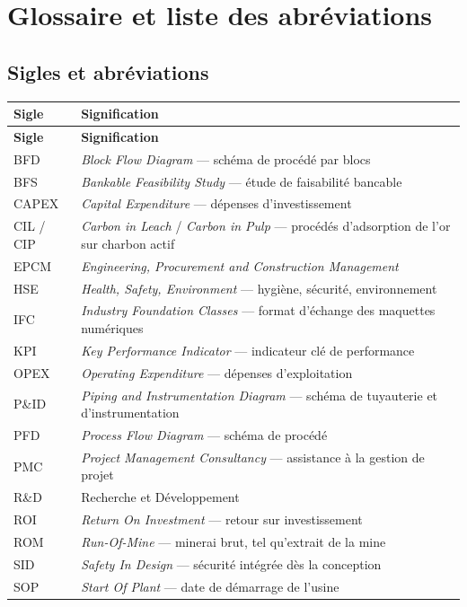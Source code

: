 \chapter*{Glossaire et liste des abréviations}

\section*{Sigles et abréviations}

\begin{longtable}{@{}p{2.8cm} p{11.5cm}@{}}
\toprule
\textbf{Sigle} & \textbf{Signification} \\
\midrule
\endfirsthead
\toprule
\textbf{Sigle} & \textbf{Signification} \\
\midrule
\endhead
\bottomrule
\endfoot
BFD & \textit{Block Flow Diagram} --- schéma de procédé par blocs \\
BFS & \textit{Bankable Feasibility Study} --- étude de faisabilité bancable \\
CAPEX & \textit{Capital Expenditure} --- dépenses d'investissement \\
CIL / CIP & \textit{Carbon in Leach} / \textit{Carbon in Pulp} --- procédés d'adsorption de l'or sur charbon actif \\
EPCM & \textit{Engineering, Procurement and Construction Management} \\
HSE & \textit{Health, Safety, Environment} --- hygiène, sécurité, environnement \\
IFC & \textit{Industry Foundation Classes} --- format d'échange des maquettes numériques \\
KPI & \textit{Key Performance Indicator} --- indicateur clé de performance \\
OPEX & \textit{Operating Expenditure} --- dépenses d'exploitation \\
P\&ID & \textit{Piping and Instrumentation Diagram} --- schéma de tuyauterie et d'instrumentation \\
PFD & \textit{Process Flow Diagram} --- schéma de procédé \\
PMC & \textit{Project Management Consultancy} --- assistance à la gestion de projet \\
R\&D & Recherche et Développement \\
ROI & \textit{Return On Investment} --- retour sur investissement \\
ROM & \textit{Run-Of-Mine} --- minerai brut, tel qu'extrait de la mine \\
SID & \textit{Safety In Design} --- sécurité intégrée dès la conception \\
SOP & \textit{Start Of Plant} --- date de démarrage de l'usine \\
\end{longtable}

